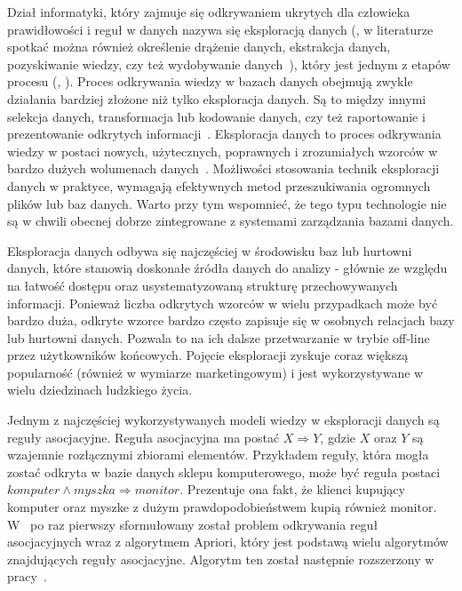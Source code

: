 Dział informatyki, który zajmuje się odkrywaniem ukrytych dla człowieka prawidłowości i reguł w danych nazywa się eksploracją danych (, w literaturze spotkać można również określenie drążenie danych, ekstrakcja danych, pozyskiwanie wiedzy, czy też wydobywanie danych~\cite{Elmasri:db}), który jest jednym z etapów procesu  (, ). Proces odkrywania wiedzy w bazach danych obejmują zwykle działania bardziej złożone niż tylko eksploracja danych. Są to między innymi selekcja danych, transformacja lub kodowanie danych, czy też raportowanie i prezentowanie odkrytych informacji~\cite{Elmasri:db}. Eksploracja danych to proces odkrywania wiedzy w postaci nowych, użytecznych, poprawnych i zrozumiałych wzorców w bardzo dużych wolumenach danych~\cite{DataMiningStart}. Możliwości stosowania technik eksploracji danych w praktyce, wymagają efektywnych metod przeszukiwania ogromnych plików lub baz danych. Warto przy tym wspomnieć, że tego typu technologie nie są w chwili obecnej dobrze zintegrowane z systemami zarządzania bazami danych.

Eksploracja danych odbywa się najczęściej w środowisku baz lub hurtowni danych, które stanowią doskonałe źródła danych do analizy - głównie ze względu na łatwość dostępu oraz usystematyzowaną strukturę przechowywanych informacji. Ponieważ liczba odkrytych wzorców w wielu przypadkach może być bardzo duża, odkryte wzorce bardzo często zapisuje się w osobnych relacjach bazy lub hurtowni danych. Pozwala to na ich dalsze przetwarzanie w trybie off-line przez użytkowników końcowych. Pojęcie eksploracji zyskuje coraz większą popularność (również w wymiarze marketingowym) i jest wykorzystywane w wielu dziedzinach ludzkiego życia.

Jednym z najczęściej wykorzystywanych modeli wiedzy w eksploracji danych są reguły asocjacyjne. Reguła asocjacyjna ma postać $X \Rightarrow Y$, gdzie $X$ oraz $Y$ są wzajemnie rozłącznymi zbiorami elementów. Przykładem reguły, która mogła zostać odkryta w bazie danych sklepu komputerowego, może być reguła postaci $komputer \land myszka \Rightarrow monitor$. Prezentuje ona fakt, że klienci kupujący komputer oraz myszke z dużym prawdopodobieństwem kupią również monitor. W~\cite{Problem:Statement} po raz pierwszy sformułowany został problem odkrywania reguł asocjacyjnych wraz z algorytmem Apriori, który jest podstawą wielu algorytmów znajdujących reguły asocjacyjne. Algorytm ten został następnie rozszerzony w pracy~\cite{AssRulesStrt}.

